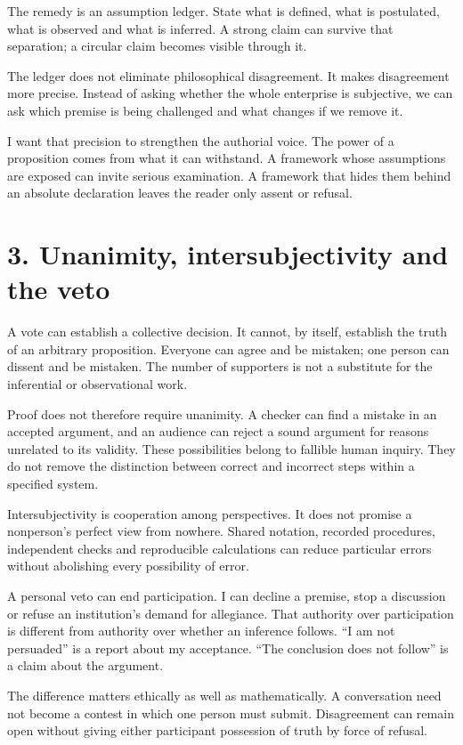 \documentclass[10pt]{article}
\begin{document}
The remedy is an assumption ledger. State what is defined, what is postulated, what is observed and what is inferred. A strong claim can survive that separation; a circular claim becomes visible through it.

The ledger does not eliminate philosophical disagreement. It makes disagreement more precise. Instead of asking whether the whole enterprise is subjective, we can ask which premise is being challenged and what changes if we remove it.

I want that precision to strengthen the authorial voice. The power of a proposition comes from what it can withstand. A framework whose assumptions are exposed can invite serious examination. A framework that hides them behind an absolute declaration leaves the reader only assent or refusal.

\clearpage
\section*{3. Unanimity, intersubjectivity and the veto}
A vote can establish a collective decision. It cannot, by itself, establish the truth of an arbitrary proposition. Everyone can agree and be mistaken; one person can dissent and be mistaken. The number of supporters is not a substitute for the inferential or observational work.

Proof does not therefore require unanimity. A checker can find a mistake in an accepted argument, and an audience can reject a sound argument for reasons unrelated to its validity. These possibilities belong to fallible human inquiry. They do not remove the distinction between correct and incorrect steps within a specified system.

Intersubjectivity is cooperation among perspectives. It does not promise a nonperson's perfect view from nowhere. Shared notation, recorded procedures, independent checks and reproducible calculations can reduce particular errors without abolishing every possibility of error.

A personal veto can end participation. I can decline a premise, stop a discussion or refuse an institution's demand for allegiance. That authority over participation is different from authority over whether an inference follows. ``I am not persuaded'' is a report about my acceptance. ``The conclusion does not follow'' is a claim about the argument.

The difference matters ethically as well as mathematically. A conversation need not become a contest in which one person must submit. Disagreement can remain open without giving either participant possession of truth by force of refusal.
\end{document}
